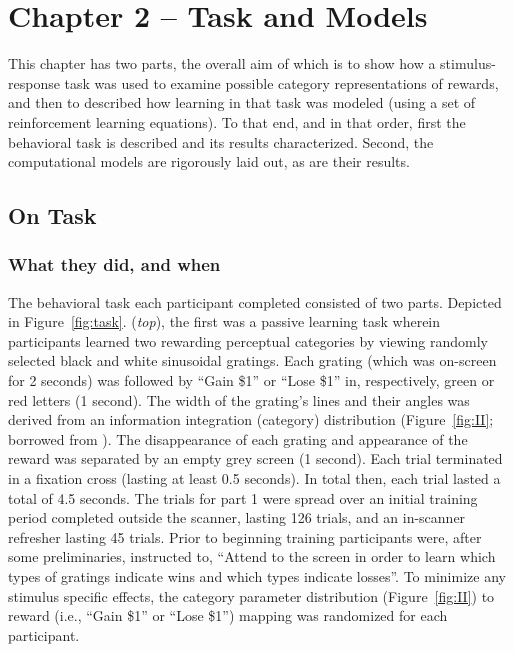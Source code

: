 \section{Chapter 2 -- Task and Models} %
\label{sec:task_and_models}
This chapter has two parts, the overall aim of which is to show how a stimulus-response task was used to examine possible category representations of rewards, and then to described how learning in that task was modeled (using a set of reinforcement learning equations).  To that end, and in that order, first the behavioral task is described and its results characterized.  Second, the computational models are rigorously laid out, as are their results.

\subsection{On Task}
\label{sub:to_task}
\subsubsection{What they did, and when}
\label{subsub:whatwhen}
The behavioral task each participant completed consisted of two parts.  Depicted in Figure~\ref{fig:task}. (\emph{top}), the first was a passive learning task wherein participants learned two rewarding perceptual categories by viewing randomly selected black and white sinusoidal gratings.  Each grating (which was on-screen for 2 seconds) was followed by ``Gain \$1'' or ``Lose \$1'' in, respectively, green or red letters (1 second).  The width of the grating's lines and their angles was derived from an information integration (category) distribution (Figure~\ref{fig:II}; borrowed from ).  The disappearance of each grating and appearance of the reward was separated by an empty grey screen (1 second).  Each trial terminated in a fixation cross (lasting at least 0.5 seconds). In total then, each trial lasted a total of 4.5 seconds.  The trials for part 1 were spread over an initial training period completed outside the scanner, lasting 126 trials, and an in-scanner refresher lasting 45 trials.  Prior to beginning training participants were, after some preliminaries, instructed to, ``Attend to the screen in order to learn which types of gratings indicate wins and which types indicate losses''.  To minimize any stimulus specific effects, the category parameter distribution (Figure~\ref{fig:II}) to reward (i.e., ``Gain \$1'' or ``Lose \$1'') mapping was randomized for each participant.

